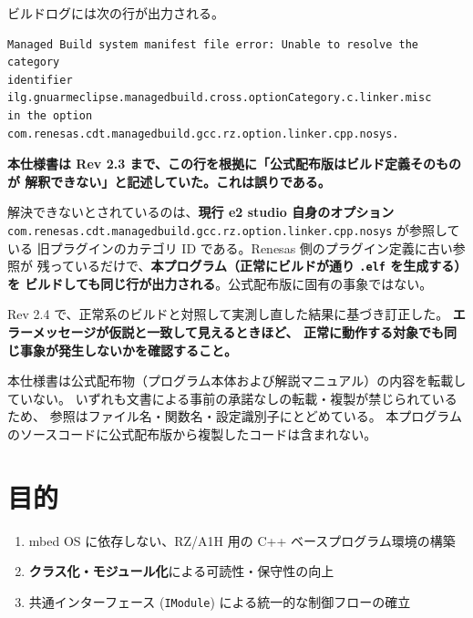 \documentclass[a4paper,11pt,dvipdfmx]{jsarticle}
\begin{document}
\begin{cautionbox}
ビルドログには次の行が出力される。

\begin{lstlisting}[caption={両プロジェクトで共通して出力される行},label=lst:manifesterr]
Managed Build system manifest file error: Unable to resolve the category
identifier ilg.gnuarmeclipse.managedbuild.cross.optionCategory.c.linker.misc
in the option com.renesas.cdt.managedbuild.gcc.rz.option.linker.cpp.nosys.
\end{lstlisting}

\textbf{本仕様書は Rev 2.3 まで、この行を根拠に「公式配布版はビルド定義そのものが
解釈できない」と記述していた。これは誤りである。}

解決できないとされているのは、\textbf{現行 e2 studio 自身のオプション}
\texttt{com.renesas.cdt.managedbuild.gcc.rz.option.linker.cpp.nosys} が参照している
旧プラグインのカテゴリ ID である。Renesas 側のプラグイン定義に古い参照が
残っているだけで、\textbf{本プログラム（正常にビルドが通り \texttt{.elf} を生成する）を
ビルドしても同じ行が出力される}。公式配布版に固有の事象ではない。

Rev 2.4 で、正常系のビルドと対照して実測し直した結果に基づき訂正した。
\textbf{エラーメッセージが仮説と一致して見えるときほど、
正常に動作する対象でも同じ事象が発生しないかを確認すること。}
\end{cautionbox}

\begin{notebox}[公式配布物の扱い]
本仕様書は公式配布物（プログラム本体および解説マニュアル）の内容を転載していない。
いずれも文書による事前の承諾なしの転載・複製が禁じられているため、
参照はファイル名・関数名・設定識別子にとどめている。
本プログラムのソースコードに公式配布版から複製したコードは含まれない。
\end{notebox}

\section{目的}\label{sec:purpose}

\begin{enumerate}[nosep]
  \item mbed OS に依存しない、RZ/A1H 用の C++ ベースプログラム環境の構築
  \item \textbf{クラス化・モジュール化}による可読性・保守性の向上
  \item 共通インターフェース (\texttt{IModule}) による統一的な制御フローの確立
\end{enumerate}
\end{document}
